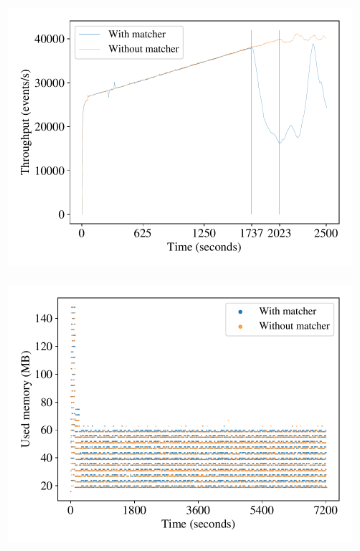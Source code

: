 \begin{figure}[t!]
    \centering
    \begin{subfigure}[t]{0.33\textwidth}
        \centering
        \includegraphics[width=1.0\textwidth]{figures/diffstream/throughput-accelerated.pdf}
        \caption{}\label{diffstream:fig:throughput}
    \end{subfigure}%
    \begin{subfigure}[t]{0.33\textwidth}
        \centering
        \includegraphics[width=1.0\textwidth]{figures/diffstream/used_memory_in_time.pdf}
        \caption{}\label{diffstream:fig:memory-in-time}
    \end{subfigure}%
    \begin{subfigure}[t]{0.33\textwidth}

\end{subfigure}
\end{figure}
